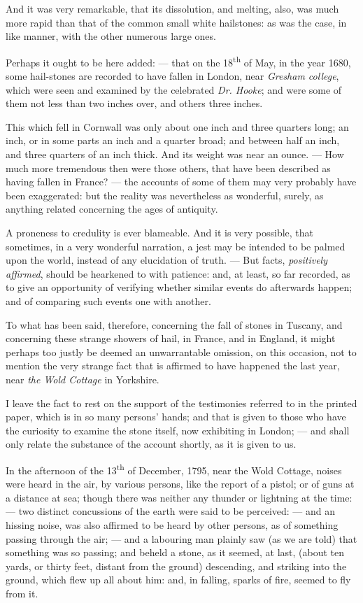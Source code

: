 \documentclass[a4paper, 12pt, oneside]{article}
\begin{document}
And it was very remarkable, that its dissolution, and melting, also, was much more rapid than that of the common small white hailstones: as was the case, in like manner, with the other numerous large ones.

Perhaps it ought to be here added: --- that on the 18\textsuperscript{th} of May, in the year 1680, some hail-stones are recorded to have fallen in London, near \emph{Gresham college}, which were seen and examined by the celebrated \emph{Dr. Hooke}; and were some of them not less than two inches over, and others three inches.

This which fell in Cornwall was only about one inch and three quarters long; an inch, or in some parts an inch and a quarter broad; and between half an inch, and three quarters of an inch thick. And its weight was near an ounce. --- How much more tremendous then were those others, that have been described as having fallen in France? --- the accounts of some of them may very probably have been exaggerated: but the reality was nevertheless as wonderful, surely, as anything related concerning the ages of antiquity.

A proneness to credulity is ever blameable. And it is very possible, that sometimes, in a very wonderful narration, a jest may be intended to be palmed upon the world, instead of any elucidation of truth. --- But facts, \emph{positively affirmed}, should be hearkened to with patience: and, at least, so far recorded, as to give an opportunity of verifying whether similar events do afterwards happen; and of comparing such events one with another.

To what has been said, therefore, concerning the fall of stones in Tuscany, and concerning these strange showers of hail, in France, and in England, it might perhaps too justly be deemed an unwarrantable omission, on this occasion, not to mention the very strange fact that is affirmed to have happened the last year, near \emph{the Wold Cottage} in Yorkshire.

I leave the fact to rest on the support of the testimonies referred to in the printed paper, which is in so many persons' hands; and that is given to those who have the curiosity to examine the stone itself, now exhibiting in London; --- and shall only relate the substance of the account shortly, as it is given to us.

In the afternoon of the 13\textsuperscript{th} of December, 1795, near the Wold Cottage, noises were heard in the air, by various persons, like the report of a pistol; or of guns at a distance at sea; though there was neither any thunder or lightning at the time: --- two distinct concussions of the earth were said to be perceived: --- and an hissing noise, was also affirmed to be heard by other persons, as of something passing through the air; --- and a labouring man plainly saw (as we are told) that something was so passing; and beheld a stone, as it seemed, at last, (about ten yards, or thirty feet, distant from the ground) descending, and striking into the ground, which flew up all about him: and, in falling, sparks of fire, seemed to fly from it.
\end{document}

